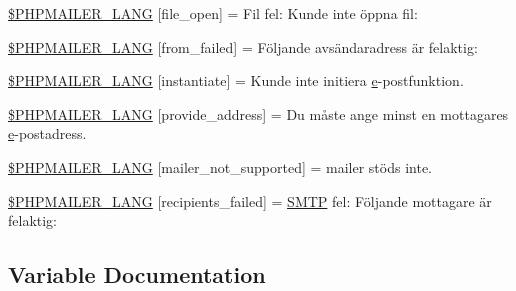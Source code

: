 \begin{DoxyCompactItemize}
\item 
\hyperlink{phpmailer_8lang-se_8php_a28d1a6517bf4c942a0ddd506188ad2e0}{\$\+P\+H\+P\+M\+A\+I\+L\+E\+R\+\_\+\+L\+A\+NG} \mbox{[}\textquotesingle{}file\+\_\+open\textquotesingle{}\mbox{]} = \textquotesingle{}Fil fel\+: Kunde inte öppna fil\+: \textquotesingle{}
\item 
\hyperlink{phpmailer_8lang-se_8php_adf832ae12155a09be077c6d5e4fd7e22}{\$\+P\+H\+P\+M\+A\+I\+L\+E\+R\+\_\+\+L\+A\+NG} \mbox{[}\textquotesingle{}from\+\_\+failed\textquotesingle{}\mbox{]} = \textquotesingle{}Följande avsändaradress är felaktig\+: \textquotesingle{}
\item 
\hyperlink{phpmailer_8lang-se_8php_ad58dde16780f4770ccf4dd282ea1f5ad}{\$\+P\+H\+P\+M\+A\+I\+L\+E\+R\+\_\+\+L\+A\+NG} \mbox{[}\textquotesingle{}instantiate\textquotesingle{}\mbox{]} = \textquotesingle{}Kunde inte initiera \hyperlink{jquery-ui_8min_8js_abea95a4e94bc6f4151d5683d4c12c3f4}{e}-\/postfunktion.\textquotesingle{}
\item 
\hyperlink{phpmailer_8lang-se_8php_a8b97897c2406b7392b056f375feeefbb}{\$\+P\+H\+P\+M\+A\+I\+L\+E\+R\+\_\+\+L\+A\+NG} \mbox{[}\textquotesingle{}provide\+\_\+address\textquotesingle{}\mbox{]} = \textquotesingle{}Du måste ange minst en mottagares \hyperlink{jquery-ui_8min_8js_abea95a4e94bc6f4151d5683d4c12c3f4}{e}-\/postadress.\textquotesingle{}
\item 
\hyperlink{phpmailer_8lang-se_8php_aa2ebcb8833ee83a7ad67401c4bb3a6ad}{\$\+P\+H\+P\+M\+A\+I\+L\+E\+R\+\_\+\+L\+A\+NG} \mbox{[}\textquotesingle{}mailer\+\_\+not\+\_\+supported\textquotesingle{}\mbox{]} = \textquotesingle{} mailer stöds inte.\textquotesingle{}
\item 
\hyperlink{phpmailer_8lang-se_8php_a7589d30bb9b368327c2df015f3e6bcba}{\$\+P\+H\+P\+M\+A\+I\+L\+E\+R\+\_\+\+L\+A\+NG} \mbox{[}\textquotesingle{}recipients\+\_\+failed\textquotesingle{}\mbox{]} = \textquotesingle{}\hyperlink{class_s_m_t_p}{S\+M\+TP} fel\+: Följande mottagare är felaktig\+: \textquotesingle{}
\end{DoxyCompactItemize}


\subsection{Variable Documentation}
